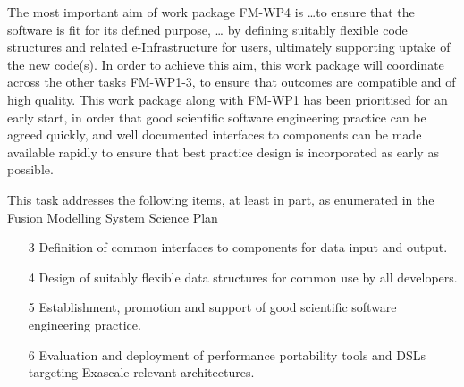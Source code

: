 The most important aim of work package FM-WP4 is \ldots to
ensure that the software is fit for its defined purpose, \ldots
by defining suitably flexible code structures and related e-Infrastructure 
for users, ultimately supporting uptake of the new code(s). In order to achieve 
this aim, this work package will coordinate across the other tasks FM-WP1-3, to 
ensure that outcomes are compatible and of high quality.
This work package along with FM-WP1 has been prioritised for an early start, in order
that good scientific software engineering practice can be agreed quickly, and well 
documented interfaces to components can be made available rapidly to ensure that best 
practice design is incorporated as early as possible.

This task addresses the following items, at least in part, as enumerated in the
Fusion Modelling System Science Plan~\cite{sciplan}

\begin{enumerate}


\item[3] Definition of common interfaces to components for data input and output. 

\item[4] Design of suitably flexible data structures for common use by all developers. 

\item[5] Establishment, promotion and support of good scientific software engineering practice. 

\item[6] Evaluation and deployment of performance portability tools and DSLs targeting 
Exascale-relevant architectures. 


\end{enumerate}


